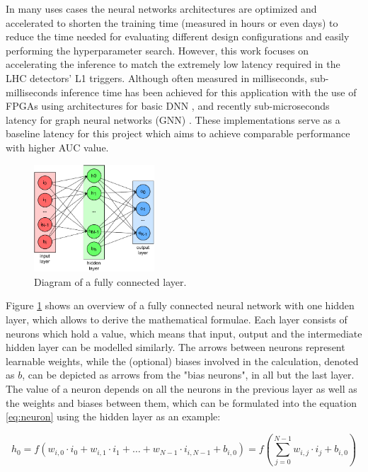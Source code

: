 In many uses cases the neural networks architectures are optimized and accelerated to shorten the training time (measured in hours or even days) to reduce the time needed for evaluating different design configurations and easily performing the hyperparameter search. However, this work focuses on accelerating the inference to match the extremely low latency required in the LHC detectors' L1 triggers. Although often measured in milliseconds, sub-milliseconds inference time has been achieved for this application with the use of FPGAs using architectures for basic DNN \cite{36-kreinar2018fast}, and recently sub-microseconds latency for graph neural networks (GNN) \cite{42-kreinar2020distance-weighted, 41-elabd2021graph}. These implementations serve as a baseline latency for this project which aims to achieve comparable performance with higher AUC value.

\begin{figure}[hpt!]
  \centering
  \includegraphics[trim={0cm 0cm 0cm 0cm}, width=0.4\textwidth, center]{background/fully_connected_layer.pdf}
  \caption{Diagram of a fully connected layer.}
  \label{fig:fully-connected-layer}
\end{figure}

Figure \ref{fig:fully-connected-layer} shows an overview of a fully connected neural network with one hidden layer, which allows to derive the mathematical formulae. Each layer consists of neurons which hold a value, which means that input, output and the intermediate hidden layer can be modelled similarly. The arrows between neurons represent learnable weights, while the (optional) biases involved in the calculation, denoted as \(b\), can be depicted as arrows from the "bias neurons", in all but the last layer. The value of a neuron depends on all the neurons in the previous layer as well as the weights and biases between them, which can be formulated into the equation \ref{eq:neuron} using the hidden layer as an example:

\begin{equation}\label{eq:neuron}
  h_0 = f ( w_{i, 0} \cdot i_0 + w_{i, 1} \cdot i_1 + \hdots + w_{N-1} \cdot i_{i, N-1} + b_{i, 0} )
  = f ( \sum_{j=0}^{N-1} w_{i, j} \cdot i_j + b_{i, 0} )
\end{equation}

